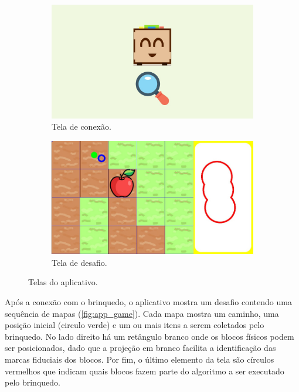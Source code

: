 \begin{figure}[!h]
    \begin{subfigure}{.5\textwidth}
        \centering
        \includegraphics[width=.9\linewidth,fbox]{figs/app_connection.jpeg}
        \caption{Tela de conexão.}
        \label{fig:app_connection}
    \end{subfigure}
    \begin{subfigure}{.5\textwidth}
        \centering
        \includegraphics[width=.9\linewidth,fbox]{figs/app_game.jpeg}
        \caption{Tela de desafio.}
        \label{fig:app_game}
    \end{subfigure}
    \caption{Telas do aplicativo.}
    \label{fig:app_screens}
\end{figure}

Após a conexão com o brinquedo, o aplicativo mostra um desafio contendo uma sequência de mapas (\autoref{fig:app_game}). Cada mapa mostra um caminho, uma posição inicial (circulo verde) e um ou mais itens a serem coletados pelo brinquedo. No lado direito há um retângulo branco onde os blocos físicos podem ser posicionados, dado que a projeção em branco facilita a identificação das marcas fiduciais dos blocos. Por fim, o último elemento da tela são círculos vermelhos que indicam quais blocos fazem parte do algoritmo a ser executado pelo brinquedo. 

